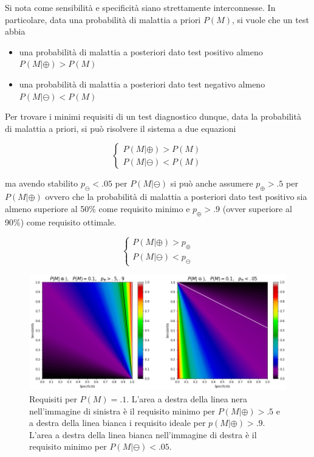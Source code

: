 \documentclass[11pt]{article}
\providecommand{\tightlist}{%
      \setlength{\itemsep}{0pt}\setlength{\parskip}{0pt}}
\begin{document}
    
    Si nota come sensibilità e specificità siano strettamente interconnesse.
In particolare, data una probabilità di malattia a priori \(P(M)\), si
vuole che un test abbia

\begin{itemize}
\tightlist
\item
  una probabilità di malattia a posteriori dato test positivo almeno
  \(P(M|\oplus)>P(M)\)
\item
  una probabilità di malattia a posteriori dato test negativo almeno
  \(P(M|\ominus)<P(M)\)
\end{itemize}

Per trovare i minimi requisiti di un test diagnostico dunque, data la
probabilità di malattia a priori, si può risolvere il sistema a due
equazioni

\[
\left\{\begin{matrix}
P(M|\oplus) > P(M) \\
P(M|\ominus) < P(M)
\end{matrix}\right.
\]

ma avendo stabilito \(p_{\ominus}<.05\) per \(P(M|\ominus)\) si può
anche assumere \(p_{\oplus}>.5\) per \(P(M|\oplus)\) ovvero che la
probabilità di malattia a posteriori dato test positivo sia almeno
superiore al 50\% come requisito minimo e \(p_{\oplus}>.9\) (ovver
superiore al 90\%) come requisito ottimale.

\[
\left\{\begin{matrix}
P(M|\oplus) > p_{\oplus} \\
P(M|\ominus) < p_{\ominus}
\end{matrix}\right.
\]

    
        \begin{figure}
        \centering
            \includegraphics{requisitimatrice10.png}
            \caption{Requisiti per $P(M)=.1$. L'area a destra della linea nera nell'immagine di sinistra è il requisito minimo per $P(M|\oplus)>.5$  e a destra della linea bianca i requisito ideale per $p(M|\oplus)>.9$. L'area a destra della linea bianca nell'immagine di destra è il requisito minimo per $P(M|\ominus)<.05$.}
            \label{fig:requisitimatrice10}
        \end{figure}
\end{document}
